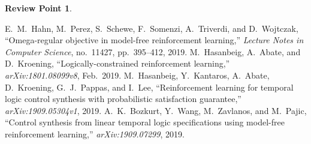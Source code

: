 \documentclass[10 pt, dvipdfmx]{article}
\theoremstyle{definition}
\newtheorem{review point}{Review Point}[section]
\begin{document}
\begin{review point}

\end{review point}

\begin{thebibliography}{99}
E.\ M.\ Hahn, M.\ Perez, S.\ Schewe, F.\ Somenzi, A.\ Triverdi, and D.\ Wojtczak,
``Omega-regular objective in model-free reinforcement learning,''
\textit{Lecture Notes in Computer Science}, no.\ 11427, pp.\ 395--412, 2019.
M.\ Hasanbeig, A.\ Abate, and D.\ Kroening,
``Logically-constrained reinforcement learning,'' \textit{arXiv:1801.08099v8}, Feb.\ 2019.
M.\ Hasanbeig, Y.\ Kantaros, A.\ Abate, D.\ Kroening, G.\ J.\ Pappas, and I.\ Lee,
``Reinforcement learning for temporal logic control synthesis with probabilistic satisfaction guarantee,''
\textit{arXiv:1909.05304v1}, 2019.
A.\ K.\ Bozkurt, Y.\ Wang, M.\ Zavlanos, and M.\ Pajic,
``Control synthesis from linear temporal logic specifications using model-free reinforcement learning,''
\textit{arXiv:1909.07299}, 2019.
\end{thebibliography}
\end{document}
